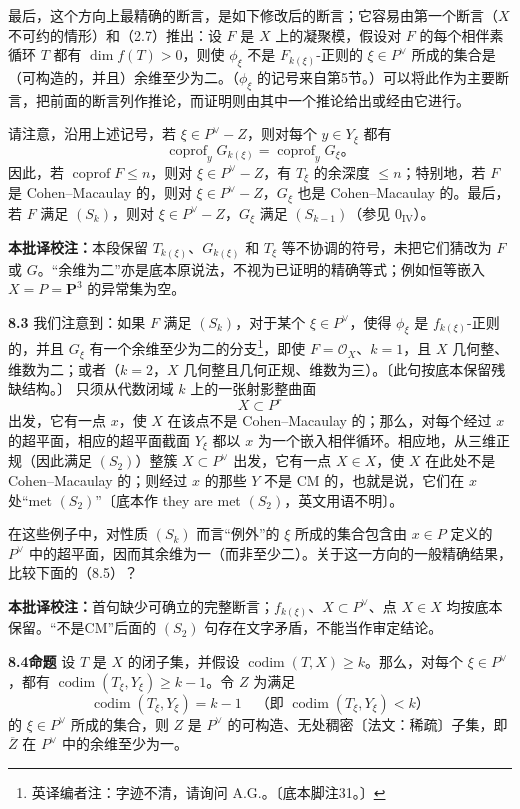 \documentclass{ctexbook}
\newcommand{\codim}{\operatorname{codim}}
\newcommand{\coprof}{\operatorname{coprof}}
\newcommand{\ednote}[1]{\footnote{英译编者注：#1}}
\newcommand{\tnote}[1]{\par\smallskip\noindent\textbf{本批译校注：}#1\par\smallskip}
\newcommand{\entry}[2]{\par\bigskip\noindent\textbf{#1\quad #2}\quad}
\begin{document}
最后，这个方向上最精确的断言，是如下修改后的断言；它容易由第一个断言（$X$ 不可约的情形）和（2.7）推出：设 $F$ 是 $X$ 上的凝聚模，假设对 $F$ 的每个相伴素循环 $T$ 都有 $\dim f(T)>0$，则使 $\phi_\xi$ 不是 $F_{k(\xi)}$-正则的 $\xi\in P^\vee$ 所成的集合是（可构造的，并且）余维至少为二。（$\phi_\xi$ 的记号来自第5节。）可以将此作为主要断言，把前面的断言列作推论，而证明则由其中一个推论给出或经由它进行。

请注意，沿用上述记号，若 $\xi\in P^\vee-Z$，则对每个 $y\in Y_\xi$ 都有
\[
\coprof_y G_{k(\xi)}=\coprof_y G_\xi\text{。}
\]
因此，若 $\coprof F\leq n$，则对 $\xi\in P^\vee-Z$，有 $T_\xi$ 的余深度 $\leq n$；特别地，若 $F$ 是 Cohen--Macaulay 的，则对 $\xi\in P^\vee-Z$，$G_\xi$ 也是 Cohen--Macaulay 的。最后，若 $F$ 满足 $(S_k)$，则对 $\xi\in P^\vee-Z$，$G_\xi$ 满足 $(S_{k-1})$（参见 $0_{\mathrm{IV}}$）。
\tnote{本段保留 $T_{k(\xi)}$、$G_{k(\xi)}$ 和 $T_\xi$ 等不协调的符号，未把它们猜改为 $F$ 或 $G$。“余维为二”亦是底本原说法，不视为已证明的精确等式；例如恒等嵌入 $X=P=\mathbf P^3$ 的异常集为空。}

\entry{8.3}{}
我们注意到：如果 $F$ 满足 $(S_k)$，对于某个 $\xi\in P^\vee$，使得 $\phi_\xi$ 是 $f_{k(\xi)}$-正则的，并且 $G_\xi$ 有一个余维至少为二的分支\ednote{字迹不清，请询问 A.G.。〔底本脚注31。〕}，即使 $F=\mathcal O_X$、$k=1$，且 $X$ 几何整、维数为二；或者（$k=2$，$X$ 几何整且几何正规、维数为三）。〔此句按底本保留残缺结构。〕
只须从代数闭域 $k$ 上的一张射影整曲面
\[
X\subset P^r
\]
出发，它有一点 $x$，使 $X$ 在该点不是 Cohen--Macaulay 的；那么，对每个经过 $x$ 的超平面，相应的超平面截面 $Y_\xi$ 都以 $x$ 为一个嵌入相伴循环。相应地，从三维正规（因此满足 $(S_2)$）整簇 $X\subset P^\vee$ 出发，它有一点 $X\in X$，使 $X$ 在此处不是 Cohen--Macaulay 的；则经过 $x$ 的那些 $Y$ 不是 CM 的，也就是说，它们在 $x$ 处“met $(S_2)$”〔底本作 they are met $(S_2)$，英文用语不明〕。

在这些例子中，对性质 $(S_k)$ 而言“例外”的 $\xi$ 所成的集合包含由 $x\in P$ 定义的 $P^\vee$ 中的超平面，因而其余维为一（而非至少二）。关于这一方向的一般精确结果，比较下面的（8.5）？
\tnote{首句缺少可确立的完整断言；$f_{k(\xi)}$、$X\subset P^\vee$、点 $X\in X$ 均按底本保留。“不是CM”后面的 $(S_2)$ 句存在文字矛盾，不能当作审定结论。}

\entry{8.4}{命题}
设 $T$ 是 $X$ 的闭子集，并假设 $\codim(T,X)\geq k$。那么，对每个 $\xi\in P^\vee$，都有 $\codim(T_\xi,Y_\xi)\geq k-1$。令 $Z$ 为满足
\[
\codim(T_\xi,Y_\xi)=k-1
\quad\text{（即 }\codim(T_\xi,Y_\xi)<k\text{）}
\]
的 $\xi\in P^\vee$ 所成的集合，则 $Z$ 是 $P^\vee$ 的可构造、无处稠密〔法文：稀疏〕子集，即 $\overline Z$ 在 $P^\vee$ 中的余维至少为一。
\end{document}
